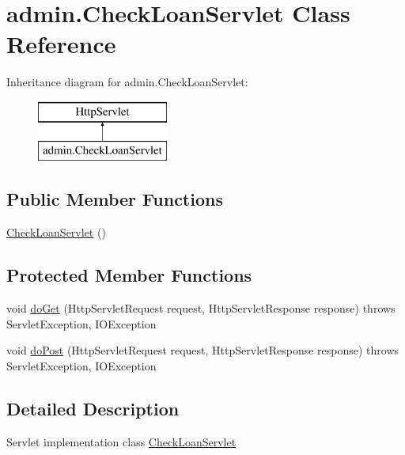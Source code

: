 \hypertarget{classadmin_1_1_check_loan_servlet}{}\section{admin.\+Check\+Loan\+Servlet Class Reference}
\label{classadmin_1_1_check_loan_servlet}
Inheritance diagram for admin.\+Check\+Loan\+Servlet\+:\begin{figure}[H]
\begin{center}
\leavevmode
\includegraphics[height=2.000000cm]{classadmin_1_1_check_loan_servlet}
\end{center}
\end{figure}
\subsection*{Public Member Functions}
\begin{DoxyCompactItemize}
\item 
\hyperlink{classadmin_1_1_check_loan_servlet_a4b9867090eb9c2ba7daec58d7c3ec0f5}{Check\+Loan\+Servlet} ()
\end{DoxyCompactItemize}
\subsection*{Protected Member Functions}
\begin{DoxyCompactItemize}
\item 
void \hyperlink{classadmin_1_1_check_loan_servlet_abbe0557187c93d0e806e751add7e5daf}{do\+Get} (Http\+Servlet\+Request request, Http\+Servlet\+Response response)  throws Servlet\+Exception, I\+O\+Exception 
\item 
void \hyperlink{classadmin_1_1_check_loan_servlet_a680e6d567885728b517df79471541ccb}{do\+Post} (Http\+Servlet\+Request request, Http\+Servlet\+Response response)  throws Servlet\+Exception, I\+O\+Exception 
\end{DoxyCompactItemize}


\subsection{Detailed Description}
Servlet implementation class \hyperlink{classadmin_1_1_check_loan_servlet}{Check\+Loan\+Servlet} 

